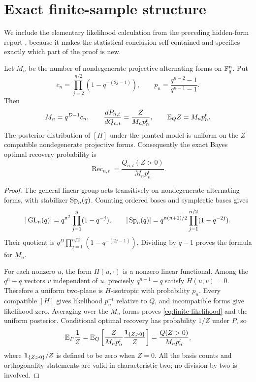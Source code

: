 \section{Exact finite-sample structure}
\label{sec:finite}

We include the elementary likelihood calculation from the preceding
hidden-form report \cite{hidden}, because it makes the statistical conclusion
self-contained and specifies exactly which part of the proof is new.

\begin{lemma}
\label{lem:likelihood}
Let $M_n$ be the number of nondegenerate projective alternating forms on
$\mathbb F_q^n$. Put
\[
 c_n=\prod_{j=2}^{n/2}(1-q^{-(2j-1)}),\qquad
 p_n=\frac{q^{n-2}-1}{q^{n-1}-1}.
\]
Then
\begin{equation}
 M_n=q^{D-1}c_n,\qquad
 \frac{dP_{n,t}}{dQ_{n,t}}=\frac{Z}{M_np_n^t},\qquad
 \mathbb E_Q Z=M_np_n^t.
 \label{eq:finite-likelihood}
\end{equation}
The posterior distribution of $[H]$ under the planted model is uniform on
the $Z$ compatible nondegenerate projective forms. Consequently the exact
Bayes optimal recovery probability is
\begin{equation}
 \operatorname{Rec}_{n,t}=\frac{Q_{n,t}(Z>0)}{M_np_n^t}.
 \label{eq:finite-recovery}
\end{equation}
\end{lemma}

\begin{proof}
The general linear group acts transitively on nondegenerate alternating
forms, with stabilizer $\operatorname{Sp}_n(q)$. Counting ordered bases and symplectic
bases gives
\[
 |\operatorname{GL}_n(q)|=q^{n^2}\prod_{j=1}^n(1-q^{-j}),\qquad
 |\operatorname{Sp}_n(q)|=q^{n(n+1)/2}\prod_{j=1}^{n/2}(1-q^{-2j}).
\]
Their quotient is
$q^D\prod_{j=1}^{n/2}(1-q^{-(2j-1)})$. Dividing by $q-1$ proves the
formula for $M_n$.

For each nonzero $u$, the form $H(u,\cdot)$ is a nonzero linear functional.
Among the $q^n-q$ vectors $v$ independent of $u$, precisely $q^{n-1}-q$
satisfy $H(u,v)=0$. Therefore a uniform two-plane is $H$-isotropic with
probability $p_n$. Every compatible $[H]$ gives likelihood $p_n^{-t}$
relative to $Q$, and incompatible forms give likelihood zero. Averaging over
the $M_n$ forms proves \eqref{eq:finite-likelihood} and the uniform posterior.
Conditional optimal recovery has probability $1/Z$ under $P$, so
\[
 \mathbb E_P\frac1Z
 =\mathbb E_Q\left[\frac{Z}{M_np_n^t}\frac{\mathbf 1_{\{Z>0\}}}{Z}\right]
 =\frac{Q(Z>0)}{M_np_n^t},
\]
where $\mathbf 1_{\{Z>0\}}/Z$ is defined to be zero when $Z=0$.
All the basis counts and orthogonality statements are valid in characteristic
two; no division by two is involved.
\end{proof}

